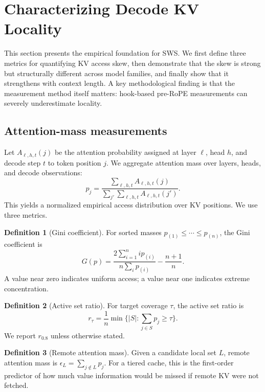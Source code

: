 \documentclass[11pt]{article}
\newcommand{\method}{SWS}
\theoremstyle{definition}
\newtheorem{definition}{Definition}
\theoremstyle{plain}
\begin{document}
\section{Characterizing Decode KV Locality}
\label{sec:characterization}

This section presents the empirical foundation for \method{}.  We first define three metrics for quantifying KV access skew, then demonstrate that the skew is strong but structurally different across model families, and finally show that it strengthens with context length.  A key methodological finding is that the measurement method itself matters: hook-based pre-RoPE measurements can severely underestimate locality.

\subsection{Attention-mass measurements}
Let $A_{\ell,h,t}(j)$ be the attention probability assigned at layer $\ell$, head $h$, and decode step $t$ to token position $j$.  We aggregate attention mass over layers, heads, and decode observations:
\begin{equation}
  p_j = \frac{\sum_{\ell,h,t} A_{\ell,h,t}(j)}{\sum_{j'}\sum_{\ell,h,t} A_{\ell,h,t}(j')}.
\end{equation}
This yields a normalized empirical access distribution over KV positions.  We use three metrics.

\begin{definition}[Gini coefficient]
For sorted masses $p_{(1)} \le \cdots \le p_{(n)}$, the Gini coefficient is
\begin{equation}
G(p)=\frac{2\sum_{i=1}^{n} i p_{(i)}}{n\sum_i p_{(i)}}-\frac{n+1}{n}.
\end{equation}
A value near zero indicates uniform access; a value near one indicates extreme concentration.
\end{definition}

\begin{definition}[Active set ratio]
For target coverage $\tau$, the active set ratio is
\begin{equation}
  r_\tau = \frac{1}{n}\min\{|S|: \sum_{j\in S}p_j \ge \tau\}.
\end{equation}
We report $r_{0.8}$ unless otherwise stated.
\end{definition}

\begin{definition}[Remote attention mass]
Given a candidate local set $L$, remote attention mass is $\epsilon_L=\sum_{j\notin L}p_j$.  For a tiered cache, this is the first-order predictor of how much value information would be missed if remote KV were not fetched.
\end{definition}
\end{document}
